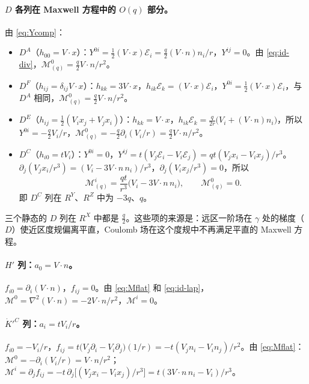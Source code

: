 \documentclass[11pt,a4paper]{ctexart}
\numberwithin{equation}{section}
\begin{document}
\paragraph{$D$ 各列在 Maxwell 方程中的 $O(q)$ 部分。}由 \eqref{eq:Ycomp}：
\begin{itemize}
\item $D^A$（$h_{00}=V\!\cdot x$）：$Y^{0i}=\tfrac12(V\!\cdot x)\mathcal E_i=\tfrac q2(V\!\cdot n)n_i/r$，$Y^{ij}=0$。由 \eqref{eq:id-div}，$\mathcal M^0_{(q)}=\tfrac q2V\!\cdot n/r^2$。
\item $D^F$（$h_{ij}=\delta_{ij}V\!\cdot x$）：$h_{kk}=3V\!\cdot x$，$h_{ik}\mathcal E_k=(V\!\cdot x)\mathcal E_i$，$Y^{0i}=\tfrac12(V\!\cdot x)\mathcal E_i$，与 $D^A$ 相同，$\mathcal M^0_{(q)}=\tfrac q2V\!\cdot n/r^2$。
\item $D^E$（$h_{ij}=\tfrac12(V_ix_j+V_jx_i)$）：$h_{kk}=V\!\cdot x$，$h_{ik}\mathcal E_k=\tfrac q{2r}\big(V_i+(V\!\cdot n)n_i\big)$，所以 $Y^{0i}=-\tfrac q2V_i/r$，$\mathcal M^0_{(q)}=-\tfrac q2\partial_i(V_i/r)=\tfrac q2V\!\cdot n/r^2$。
\item $D^C$（$h_{i0}=tV_i$）：$Y^{0i}=0$，$Y^{ij}=t(V_j\mathcal E_i-V_i\mathcal E_j)=qt(V_jx_i-V_ix_j)/r^3$。$\partial_j(V_jx_i/r^3)=(V_i-3V\!\cdot n\,n_i)/r^3$，$\partial_j(V_ix_j/r^3)=0$，所以
\begin{equation*}
\mathcal M^i_{(q)}=\frac{qt}{r^3}\big(V_i-3V\!\cdot n\,n_i\big),\qquad \mathcal M^0_{(q)}=0 .
\end{equation*}
即 $D^C$ 列在 $R^Y$、$R^Z$ 中为 $-3q$、$q$。
\end{itemize}
三个静态的 $D$ 列在 $R^X$ 中都是 $\tfrac q2$。这些项的来源是：远区一阶场在 $\gamma$ 处的梯度（$D$）使近区度规偏离平直，Coulomb 场在这个度规中不再满足平直的 Maxwell 方程。

\paragraph{$H'$ 列：$a_0=V\!\cdot n$。}$f_{i0}=\partial_i(V\!\cdot n)$，$f_{ij}=0$。由 \eqref{eq:Mflat} 和 \eqref{eq:id-lap}，$\mathcal M^0=\nabla^2(V\!\cdot n)=-2V\!\cdot n/r^2$，$\mathcal M^i=0$。

\paragraph{$\dot K'^C$ 列：$a_i=tV_i/r$。}$f_{i0}=-V_i/r$，$f_{ij}=t\big(V_j\partial_i-V_i\partial_j\big)(1/r)=-t(V_jn_i-V_in_j)/r^2$。由 \eqref{eq:Mflat}：$\mathcal M^0=-\partial_i(V_i/r)=V\!\cdot n/r^2$；$\mathcal M^i=\partial_jf_{ij}=-t\,\partial_j\big[(V_jx_i-V_ix_j)/r^3\big]=t(3V\!\cdot n\,n_i-V_i)/r^3$。
\end{document}
